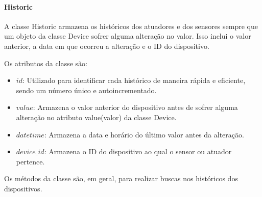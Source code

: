 \documentclass[conference, a4paper, 12pt]{IEEEtran}
\begin{document}
\paragraph{Historic}
A classe Historic armazena os históricos dos atuadores e dos sensores sempre que um objeto da classe Device sofrer alguma alteração no valor. Isso inclui o valor anterior, a data em que ocorreu a alteração e o ID do dispositivo.

Os atributos da classe são:
\begin{itemize}
  \item $id$: Utilizado para identificar cada histórico de maneira rápida e eficiente, sendo um número único e autoincrementado.
  \item $value$: Armazena o valor anterior do dispositivo antes de sofrer alguma alteração no atributo value(valor) da classe Device.
  \item $datetime$: Armazena a data e horário do último valor antes da alteração.
  \item $device\_id$:  Armazena o ID do dispositivo ao qual o sensor ou atuador pertence.
\end{itemize}

Os métodos da classe são, em geral, para realizar buscas nos históricos dos dispositivos.
\end{document}

